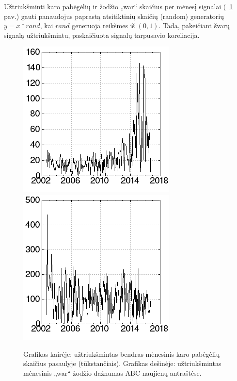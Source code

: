 Užtriukšminti karo pabėgėlių ir žodžio „war“ skaičius per mėnesį signalai (~\ref{fig:noisy} pav.) gauti panaudojus paprastą atsitiktinių skaičių (random) generatorių \(y = x * rand\), kai \(rand\) generuoja reikšmes iš \((0, 1)\). Tada, pakeičiant švarų signalą užtriukšmintu, paskaičiuota signalų tarpusavio koreliacija.

\begin{figure}
    \includegraphics[scale=0.65]{../scripts/refugees_war_rand/refugees_rand.png}
    \includegraphics[scale=0.65]{../scripts/refugees_war_rand/war_rand.png}
    \caption{Grafikas kairėje: užtriukšmintas bendras mėnesinis karo pabėgėlių skaičius pasaulyje (tūkstančiais). Grafikas dešinėje: užtriukšmintas mėnesinis „war“ žodžio dažnumas ABC naujienų antraštėse.}
    \label{fig:noisy}
\end{figure}


